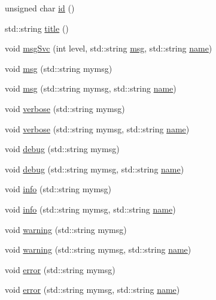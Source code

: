 \begin{DoxyCompactItemize}
unsigned char \hyperlink{classObject_af99145335cc61ff6e2798ea17db009d2}{id} ()
\item 
std\+::string \hyperlink{classObject_a73a0f1a41828fdd8303dd662446fb6c3}{title} ()
\item 
void \hyperlink{classObject_a3f9d5537ebce0c0f2bf6ae4d92426f3c}{msg\+Svc} (int level, std\+::string \hyperlink{classObject_a58b2d0618c2d08cf2383012611528d97}{msg}, std\+::string \hyperlink{classObject_a300f4c05dd468c7bb8b3c968868443c1}{name})
\item 
void \hyperlink{classObject_a58b2d0618c2d08cf2383012611528d97}{msg} (std\+::string mymsg)
\item 
void \hyperlink{classObject_ac5d59299273cee27aacf7de00d2e7034}{msg} (std\+::string mymsg, std\+::string \hyperlink{classObject_a300f4c05dd468c7bb8b3c968868443c1}{name})
\item 
void \hyperlink{classObject_a83d2db2df682907ea1115ad721c1c4a1}{verbose} (std\+::string mymsg)
\item 
void \hyperlink{classObject_a2d4120195317e2a3c6532e8bb9f3da68}{verbose} (std\+::string mymsg, std\+::string \hyperlink{classObject_a300f4c05dd468c7bb8b3c968868443c1}{name})
\item 
void \hyperlink{classObject_aac010553f022165573714b7014a15f0d}{debug} (std\+::string mymsg)
\item 
void \hyperlink{classObject_a6c9a0397ca804e04d675ed05683f5420}{debug} (std\+::string mymsg, std\+::string \hyperlink{classObject_a300f4c05dd468c7bb8b3c968868443c1}{name})
\item 
void \hyperlink{classObject_a644fd329ea4cb85f54fa6846484b84a8}{info} (std\+::string mymsg)
\item 
void \hyperlink{classObject_a1ca123253dfd30fc28b156f521dcbdae}{info} (std\+::string mymsg, std\+::string \hyperlink{classObject_a300f4c05dd468c7bb8b3c968868443c1}{name})
\item 
void \hyperlink{classObject_a65cd4fda577711660821fd2cd5a3b4c9}{warning} (std\+::string mymsg)
\item 
void \hyperlink{classObject_a11f101db4dd73d9391b0231818881d86}{warning} (std\+::string mymsg, std\+::string \hyperlink{classObject_a300f4c05dd468c7bb8b3c968868443c1}{name})
\item 
void \hyperlink{classObject_a204a95f57818c0f811933917a30eff45}{error} (std\+::string mymsg)
\item 
void \hyperlink{classObject_ad7f6c457733082efa2f9ff5f5c8e119a}{error} (std\+::string mymsg, std\+::string \hyperlink{classObject_a300f4c05dd468c7bb8b3c968868443c1}{name})

\end{DoxyCompactItemize}

